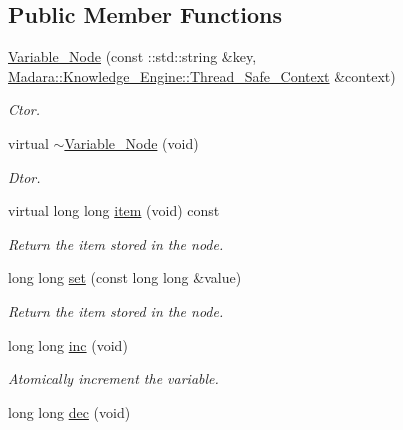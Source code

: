 \subsection*{Public Member Functions}
\begin{DoxyCompactItemize}
\item 
\hyperlink{classMadara_1_1Expression__Tree_1_1Variable__Node_a0ba7c7a979920dedf53efc21a3a07f02}{Variable\_\-Node} (const ::std::string \&key, \hyperlink{classMadara_1_1Knowledge__Engine_1_1Thread__Safe__Context}{Madara::Knowledge\_\-Engine::Thread\_\-Safe\_\-Context} \&context)
\begin{DoxyCompactList}\small\item\em Ctor. \item\end{DoxyCompactList}\item 
virtual \hyperlink{classMadara_1_1Expression__Tree_1_1Variable__Node_a6698cce0119fda075b28da70aca76a3e}{$\sim$Variable\_\-Node} (void)
\begin{DoxyCompactList}\small\item\em Dtor. \item\end{DoxyCompactList}\item 
virtual long long \hyperlink{classMadara_1_1Expression__Tree_1_1Variable__Node_ab0c1097b8e08af347fbd7361de28fe2b}{item} (void) const 
\begin{DoxyCompactList}\small\item\em Return the item stored in the node. \item\end{DoxyCompactList}\item 
long long \hyperlink{classMadara_1_1Expression__Tree_1_1Variable__Node_a43a47b254e74801857451d7bb220a0c7}{set} (const long long \&value)
\begin{DoxyCompactList}\small\item\em Return the item stored in the node. \item\end{DoxyCompactList}\item 
long long \hyperlink{classMadara_1_1Expression__Tree_1_1Variable__Node_ae1110c23a49ceb7c45b18fe937c143c0}{inc} (void)
\begin{DoxyCompactList}\small\item\em Atomically increment the variable. \item\end{DoxyCompactList}\item 
long long \hyperlink{classMadara_1_1Expression__Tree_1_1Variable__Node_a6dd7c4ce31e108996746e69645080eaf}{dec} (void)

\end{DoxyCompactItemize}
